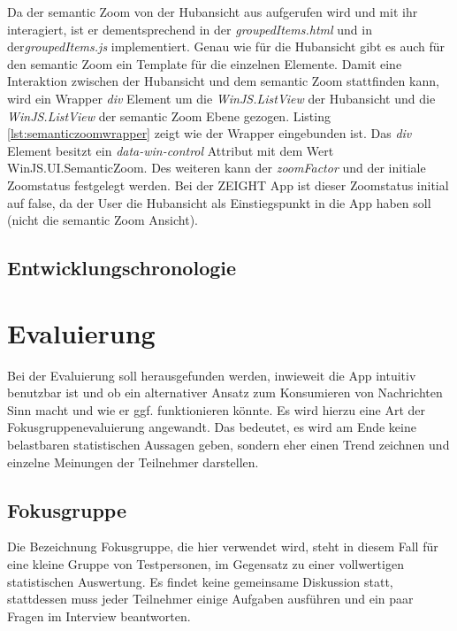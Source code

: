 \documentclass[12pt,a4paper,bibtotoc,abstracton]{scrartcl}
\begin{document}
Da der semantic Zoom von der Hubansicht aus aufgerufen wird und mit ihr interagiert, ist er dementsprechend in der \textit{groupedItems.html} und in der\textit{groupedItems.js} implementiert. Genau wie für die Hubansicht gibt es auch für den semantic Zoom ein Template für die einzelnen Elemente. Damit eine Interaktion zwischen der Hubansicht und dem semantic Zoom stattfinden kann, wird ein Wrapper \textit{div} Element um die \textit{WinJS.ListView} der Hubansicht und die \textit{WinJS.ListView} der semantic Zoom Ebene gezogen. Listing \ref{lst:semanticzoomwrapper} zeigt wie der Wrapper eingebunden ist. Das \textit{div} Element besitzt ein \textit{data-win-control} Attribut mit dem Wert \glqq WinJS.UI.SemanticZoom\grqq. Des weiteren kann der \textit{zoomFactor} und der initiale Zoomstatus festgelegt werden. Bei der ZEIGHT App ist dieser Zoomstatus initial auf false, da der User die Hubansicht als Einstiegspunkt in die App haben soll (nicht die semantic Zoom Ansicht).

\begin{minipage}{\linewidth}
  
\end{minipage}

\subsection{Entwicklungschronologie}
\label{subsec:entwicklungschronologie}


\newpage
\section{Evaluierung} 
\label{sec:evaluierung}
Bei der Evaluierung soll herausgefunden werden, inwieweit die App intuitiv benutzbar ist und ob ein alternativer Ansatz zum Konsumieren von Nachrichten Sinn macht und wie er ggf. funktionieren könnte. Es wird hierzu eine Art der Fokusgruppenevaluierung angewandt. Das bedeutet, es wird am Ende keine belastbaren statistischen Aussagen geben, sondern eher einen Trend zeichnen und einzelne Meinungen der Teilnehmer darstellen.

\subsection{Fokusgruppe}
\label{subsec:fokusgruppe}
Die Bezeichnung \glqq Fokusgruppe\grqq, die hier verwendet wird, steht in diesem Fall für eine kleine Gruppe von Testpersonen, im Gegensatz zu einer vollwertigen statistischen Auswertung. Es findet keine gemeinsame Diskussion statt, stattdessen muss jeder Teilnehmer einige Aufgaben ausführen und ein paar Fragen im Interview beantworten.
\end{document}
